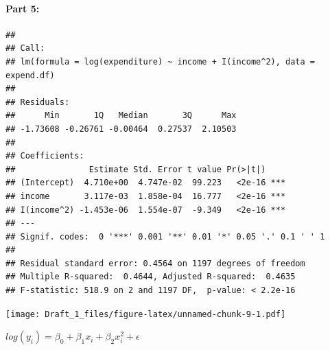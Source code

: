 \documentclass[
]{article}
\begin{document}
\hypertarget{part-5}{%
\paragraph{Part 5:}\label{part-5}}

\begin{verbatim}
## 
## Call:
## lm(formula = log(expenditure) ~ income + I(income^2), data = expend.df)
## 
## Residuals:
##      Min       1Q   Median       3Q      Max 
## -1.73608 -0.26761 -0.00464  0.27537  2.10503 
## 
## Coefficients:
##               Estimate Std. Error t value Pr(>|t|)    
## (Intercept)  4.710e+00  4.747e-02  99.223   <2e-16 ***
## income       3.117e-03  1.858e-04  16.777   <2e-16 ***
## I(income^2) -1.453e-06  1.554e-07  -9.349   <2e-16 ***
## ---
## Signif. codes:  0 '***' 0.001 '**' 0.01 '*' 0.05 '.' 0.1 ' ' 1
## 
## Residual standard error: 0.4564 on 1197 degrees of freedom
## Multiple R-squared:  0.4644, Adjusted R-squared:  0.4635 
## F-statistic: 518.9 on 2 and 1197 DF,  p-value: < 2.2e-16
\end{verbatim}

\texttt{[image: Draft\_1\_files/figure-latex/unnamed-chunk-9-1.pdf]}

\(log(y_{i})=\beta_{0}+\beta_{1}x_{i}+\beta_{2}x^2_{i}+\epsilon\)
\end{document}
